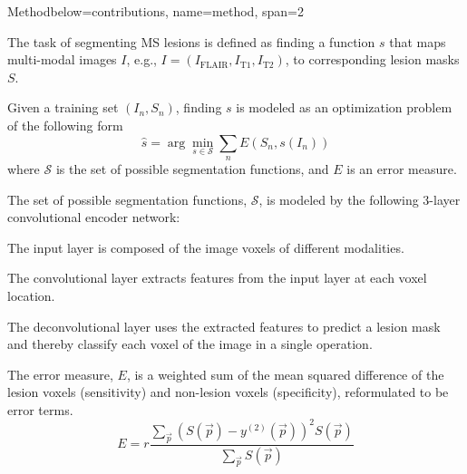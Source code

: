 \documentclass[%
portrait,paperwidth=841mm,paperheight=1180mm,%
margin=2cm,
fontscale=0.32
]{baposter}
\newcommand{\vect}[1]{\vec{#1}}
\begin{document}
\begin{poster}
\begin{headerblock}{Method}{below=contributions, name=method, span=2}
\begin{compactitem}
\item The task of segmenting MS lesions is defined as finding a function $s$
that maps multi-modal images $I$, e.g., $I = (I_\text{FLAIR}, I_\text{T1},
I_\text{T2})$, to corresponding lesion masks $S$.
\item Given a training set $(I_n,S_n)$, finding $s$ is modeled as an
optimization problem of the following form
\begin{equation}
\hat{s} = \arg \min_{s \in \mathcal{S}} \sum_n E(S_n, s(I_n))
\label{eq:segprob}
\end{equation}
where $\mathcal{S}$ is the set of possible segmentation functions, and $E$ is an
error measure.
\item The set of possible segmentation functions, $\mathcal{S}$, is modeled by
the following 3-layer convolutional encoder network:
\end{compactitem}
\begin{center}

\end{center}
% 
\begin{compactitem}
\item The input layer is composed of the image voxels of different
modalities.
\item The convolutional layer extracts features from the input layer at
each voxel location.
\item The deconvolutional layer uses the extracted features to predict a lesion
mask and thereby classify each voxel of the image in a single operation.
\item The error measure, $E$, is a weighted sum of the mean squared
difference of the lesion voxels (sensitivity) and non-lesion voxels
(specificity), reformulated to be error terms.
\begin{equation}
E = r\frac{\textstyle\sum_{\vect{p}} \left(S(\vect{p}) -
y^{(2)}(\vect{p})\right)^2 S(\vect{p})}{\textstyle\sum_{\vect{p}} S(\vect{p})}

\end{equation}
\end{compactitem}
\end{headerblock}
\end{poster}
\end{document}
